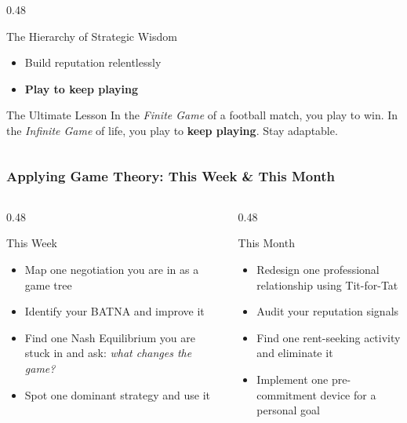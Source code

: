 \begin{frame}[fragile]
\begin{columns}
\begin{column}[T]{0.48\linewidth}
\begin{block}{The Hierarchy of Strategic Wisdom}
\begin{itemize}
          \item Build reputation relentlessly
          \item \textbf{Play to keep playing}
        \end{itemize}
      \end{block}
  \vspace{8pt}
  \begin{alertblock}{The Ultimate Lesson}
    In the \textit{Finite Game} of a football match, you play to win. In the \textit{Infinite Game} of life, you play to \textbf{keep playing}. Stay adaptable.
  \end{alertblock}	  
    \end{column}
  \end{columns}

\end{frame}

\begin{frame}[fragile]\frametitle{Applying Game Theory: This Week \& This Month}
  \begin{columns}
    \begin{column}[T]{0.48\linewidth}
      \begin{block}{This Week}
        \begin{itemize}
          \item Map one negotiation you are in as a game tree
          \item Identify your BATNA and improve it
          \item Find one Nash Equilibrium you are stuck in and ask: \textit{what changes the game?}
          \item Spot one dominant strategy and use it
        \end{itemize}
      \end{block}


    \end{column}
    \begin{column}[T]{0.48\linewidth}
      \begin{block}{This Month}
        \begin{itemize}
          \item Redesign one professional relationship using Tit-for-Tat
          \item Audit your reputation signals
          \item Find one rent-seeking activity and eliminate it
          \item Implement one pre-commitment device for a personal goal
        \end{itemize}
      \end{block}
    \end{column}
  \end{columns}
\end{frame}

